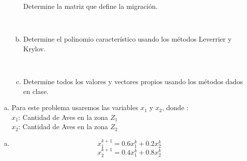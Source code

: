 \begin{frame}
\begin{enumerate}
\begin{enumerate}[a)]
			            Determine la matriz que define la migración.

			            \

			      \item

			            Determine el polinomio característico usando los
			            métodos Leverrier y Krylov.

			            \

			      \item

			            Determine todos los valores y vectores propios
			            usando los métodos dados en clase.
		      \end{enumerate}
	\end{enumerate}

	\begin{solution}
		\begin{enumerate}[a)]
			\item
            Para este problema usaremos las variables $x_{1}$ y $x_{2}$, donde :\\
            $x_{1}$: Cantidad de Aves en la zona $Z_{1}$\\
            $x_{2}$: Cantidad de Aves en la zona $Z_{2}$    
		\end{enumerate}
   \begin{enumerate}[b)]
			\item
         \begin{equation*}
            x_{1}^{k+1}=0.6x_{1}^{k}+0.2x_{2}^{k}
         \end{equation*}
         \begin{equation*}
            x_{2}^{k+1}=0.4x_{1}^{k}+0.8x_{2}^{k}
         \end{equation*}
		\end{enumerate}
  
   
	\end{solution}

\end{frame}
